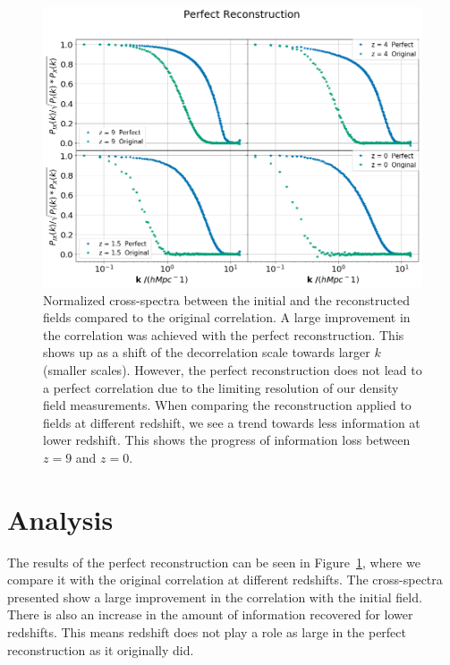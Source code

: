 
\begin{figure}
    \centering
    \includegraphics[width=1\columnwidth]{images/perfRecon/perfRecon.png}%
    
    \caption{
    Normalized cross-spectra between the initial and the reconstructed fields compared to the original correlation. A large improvement in the correlation was achieved with the perfect reconstruction. This shows up as a shift of the decorrelation scale towards larger $k$ (smaller scales). However, the perfect reconstruction does not lead to a perfect correlation due to the limiting resolution of our density field measurements. When comparing the reconstruction applied to fields at different redshift, we see a trend towards less information at lower redshift. This shows the progress of information loss between $z=9$ and $z=0$.
    }
    
    \label{fig:3.2}
\end{figure}

\section{Analysis}

The results of the perfect reconstruction can be seen in Figure~\ref{fig:3.2}, where we compare it with the original correlation at different redshifts. The cross-spectra presented show a large improvement in the correlation with the initial field. There is also an increase in the amount of information recovered for lower redshifts. This means redshift does not play a role as large in the perfect reconstruction as it originally did. 

